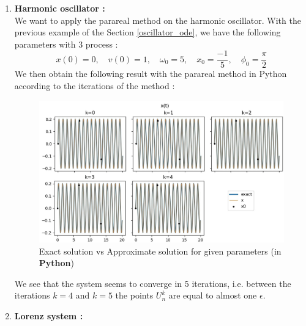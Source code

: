 \begin{enumerate}[label=\textbullet]
	\item \textbf{Harmonic oscillator :} \\
	We want to apply the parareal method on the harmonic oscillator. With the previous example of the Section \ref{oscillator_ode}, we have the following parameters with 3 process :
	$$x(0)=0,\quad v(0)=1, \quad\omega_0=5, \quad x_0=\frac{-1}{5}, \quad \phi_0=\frac{\pi}{2}$$
	We then obtain the following result with the parareal method in Python according to the iterations of the method :
	\begin{figure}[H]
		\centering
		\includegraphics[width=0.7\linewidth]{"images/parareal/cpp/osci_1.jpg"}
		\caption{Exact solution vs Approximate solution for given parameters (in \textbf{Python})}
	\end{figure}
	\noindent We see that the system seems to converge in 5 iterations, i.e. between the iterations $k=4$ and $k=5$ the points $U_n^k$ are equal to almost one $\epsilon$. 
	
	\item \textbf{Lorenz system :} \\
	

\end{enumerate}
